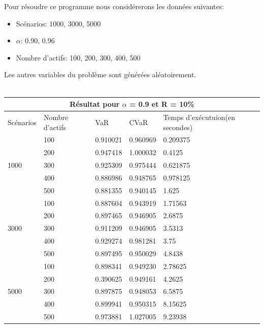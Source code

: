 \documentclass[12pt]{article}
\theoremstyle{definition}
\theoremstyle{definition}
\begin{document}
Pour résoudre ce programme nous considérerons les données suivantes:
\begin{itemize}
\item Scénarios: 1000, 3000, 5000
\item $\alpha$: 0.90, 0.96
\item Nombre d'actifs: 100, 200, 300, 400, 500
\end{itemize}
Les autres variables du problème sont générées aléatoirement.\\ \\
\begin{tabular}{|l|l|l|l|l|}
  \hline
  \multicolumn{5}{|c|}{Résultat pour \textbf{$\alpha$ = 0.9} et \textbf{R = 10\%}} \\
  \hline
  Scénarios & Nombre d'actifs & VaR & CVaR & Temps d'exécutuion(en secondes)\\ \hline
  \multirow{5}{*}{1000} & 100 & 0.910021 & 0.960969 & 0.209375\\
    & 200 & 0.947418 & 1.000032 & 0.4125\\
    & 300 & 0.925309 & 0.975444 & 0.621875\\
    & 400 & 0.886986 & 0.948765 & 0.978125\\ 
    & 500 & 0.881355 & 0.940145 & 1.625\\ \hline
  \multirow{5}{*}{3000} & 100 & 0.887604 & 0.943919 & 1.71563\\
    & 200 & 0.897465 & 0.946905 & 2.6875\\
    & 300 & 0.911209 & 0.946905 & 3.5313\\
    & 400 & 0.929274 & 0.981281 & 3.75\\ 
    & 500 & 0.897495 & 0.950029 & 4.8438\\ \hline
  \multirow{5}{*}{5000} & 100 & 0.898341 & 0.949230 & 2.78625\\
    & 200 & 0.390625 & 0.949161 & 4.2625\\
    & 300 & 0.897875 & 0.948053 & 6.5875\\
    & 400 & 0.899941 & 0.950315 & 8.15625\\ 
    & 500 & 0.973881 & 1.027005 & 9.23938\\ \hline
\end{tabular} \\ \\
\end{document}
